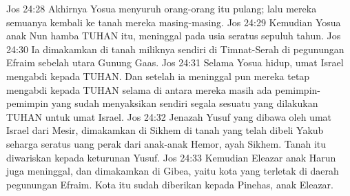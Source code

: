 Jos 24:28  Akhirnya Yosua menyuruh orang-orang itu pulang; lalu mereka semuanya kembali ke tanah mereka masing-masing.
Jos 24:29  Kemudian Yosua anak Nun hamba TUHAN itu, meninggal pada usia seratus sepuluh tahun.
Jos 24:30  Ia dimakamkan di tanah miliknya sendiri di Timnat-Serah di pegunungan Efraim sebelah utara Gunung Gaas.
Jos 24:31  Selama Yosua hidup, umat Israel mengabdi kepada TUHAN. Dan setelah ia meninggal pun mereka tetap mengabdi kepada TUHAN selama di antara mereka masih ada pemimpin-pemimpin yang sudah menyaksikan sendiri segala sesuatu yang dilakukan TUHAN untuk umat Israel.
Jos 24:32  Jenazah Yusuf yang dibawa oleh umat Israel dari Mesir, dimakamkan di Sikhem di tanah yang telah dibeli Yakub seharga seratus uang perak dari anak-anak Hemor, ayah Sikhem. Tanah itu diwariskan kepada keturunan Yusuf.
Jos 24:33  Kemudian Eleazar anak Harun juga meninggal, dan dimakamkan di Gibea, yaitu kota yang terletak di daerah pegunungan Efraim. Kota itu sudah diberikan kepada Pinehas, anak Eleazar.


